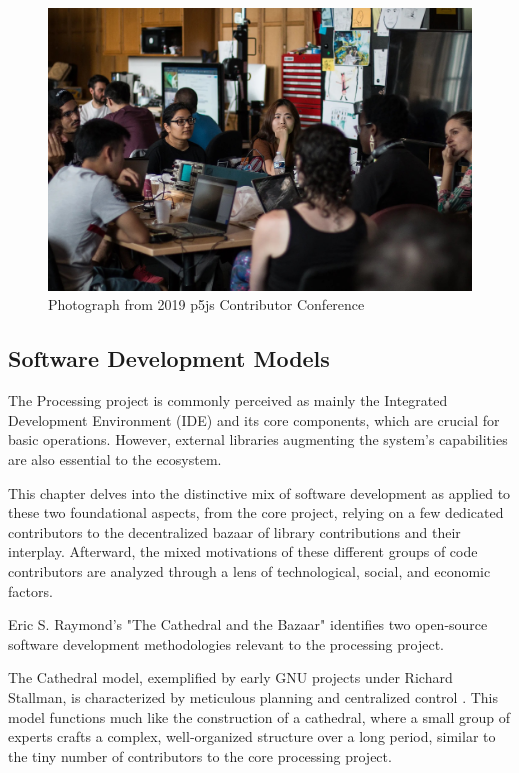 
\begin{figure}
	\centering
	\includegraphics[width=\textwidth]{images/cathedral-or-bazaar.jpeg}
	\caption{Photograph from 2019 p5js Contributor Conference}
	\label{fig:p5ps-conference}
\end{figure}


\subsection{Software Development Models}

The Processing project is commonly perceived as mainly the Integrated Development Environment (IDE) and its core components, which are crucial for basic operations. However, external libraries augmenting the system's capabilities are also essential to the ecosystem.

This chapter delves into the distinctive mix of software development as applied to these two foundational aspects, from the core project, relying on a few dedicated contributors to the decentralized bazaar of library contributions and their interplay. Afterward, the mixed motivations of these different groups of code contributors are analyzed through a lens of technological, social, and economic factors.

Eric S. Raymond's "The Cathedral and the Bazaar" \parencite{raymondCathedralBazaar1999} identifies two open-source software development methodologies relevant to the processing project. 

The Cathedral model, exemplified by early GNU projects under Richard Stallman, is characterized by meticulous planning and centralized control \parencite{stallmanFreeSoftwareFree2002}. This model functions much like the construction of a cathedral, where a small group of experts crafts a complex, well‐organized structure over a long period, similar to the tiny number of contributors to the core processing project. 

